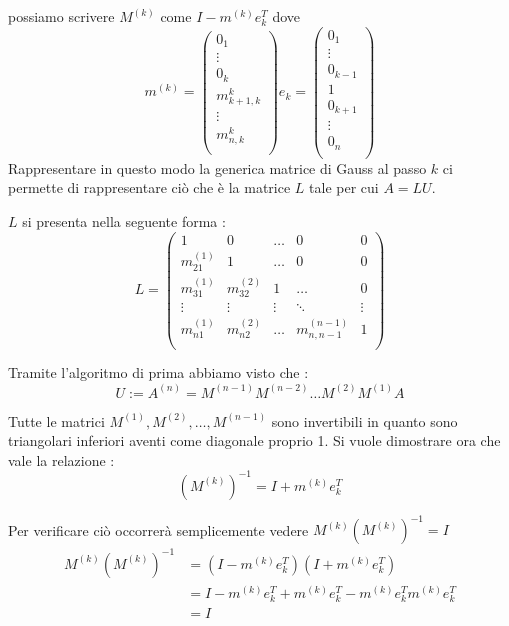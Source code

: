 \documentclass[12pt, a4paper]{book}
\theoremstyle{definition}
\begin{document}
\begin{flushleft}
possiamo scrivere $M^{(k)}$ come $I - m^{(k)}e^{T}_{k}$ dove 
\[ 
	m^{(k)} = 
	\begin{pmatrix}
		0_{1} \\
		\vdots \\
		0_{k} \\
		m^{k}_{k+1,k} \\
		\vdots \\
		m^{k}_{n,k} \\
	\end{pmatrix}
	e_{k} =
	\begin{pmatrix}
		0_{1} \\
		\vdots \\
		0_{k-1} \\
		1 \\
		0_{k+1} \\
		\vdots \\
		0_{n}  \\
	\end{pmatrix}
\]
Rappresentare in questo modo la generica matrice di Gauss al passo $k$ ci permette di rappresentare ciò che è la matrice $L$ tale per cui $A=LU$.

$L$ si presenta nella seguente forma : 
\[ 
	L = 
	\begin{pmatrix}
		1 & 0 & \dots & 0 &0 \\
		m^{(1)}_{21}& 1 & \dots & 0 & 0 \\
	    m^{(1)}_{31}& m^{(2)}_{32}& 1 & \dots & 0  \\
		\vdots &  \vdots &  \vdots  & \ddots & \vdots  \\
		m^{(1)}_{n1} & m^{(2)}_{n2} & \dots & m^{(n-1)}_{n,n-1} & 1 \\
	\end{pmatrix}
\]

Tramite l'algoritmo di prima abbiamo visto che : 
\[
	U := A^{(n)} = M^{(n-1)} M^{(n-2)} \dots M^{(2)} M^{(1)} A
\]

Tutte le matrici $M^{(1)}, M^{(2)}, \dots, M^{(n-1)}$ sono invertibili in quanto sono triangolari inferiori aventi come diagonale proprio 1. Si vuole dimostrare ora che vale la relazione :
\[		
	(M^{(k)})^{-1} = I + m^{(k)}e^{T}_{k}
\]

Per verificare ciò occorrerà semplicemente vedere $M^{(k)}(M^{(k)})^{-1} = I$
\begin{equation}
	\begin{split}
		M^{(k)}(M^{(k)})^{-1}  &= (I - m^{(k)}e^{T}_{k})(I +  m^{(k)}e^{T}_{k}) \\
										   &= I - m^{(k)}e^{T}_{k} + m^{(k)}e^{T}_{k} - m^{(k)}e^{T}_{k}m^{(k)}e^{T}_{k} \\
										   &= I							   
	\end{split}
\end{equation}


\end{flushleft}
\end{document}
